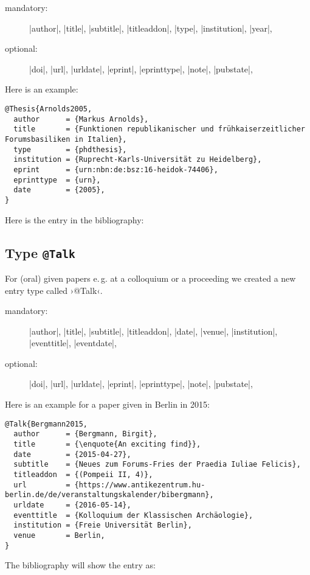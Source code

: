 \documentclass[a4paper,
10pt,
greek,
french,
spanish,
italian,
ngerman,
english
]{ltxdoc}
\begin{document}
\begin{description}
\item[mandatory:] 
|author|,
|title|, |subtitle|, |titleaddon|,
|type|, |institution|,
|year|,
\item[optional:]
|doi|, |url|, |urldate|, |eprint|, |eprinttype|, |note|, |pubstate|, 
 \end{description}
 

Here is an example:
\begin{lstlisting}[style=bibentry,label=Arnolds2005,caption={{@}Thesis\{Arnolds2005,…\} }]
@Thesis{Arnolds2005,
  author      = {Markus Arnolds},
  title       = {Funktionen republikanischer und frühkaiserzeitlicher Forumsbasiliken in Italien},
  type        = {phdthesis},
  institution = {Ruprecht-Karls-Universität zu Heidelberg},
  eprint      = {urn:nbn:de:bsz:16-heidok-74406},
  eprinttype  = {urn},
  date        = {2005},
}
\end{lstlisting}

Here is the entry in the bibliography:


 

 \subsection{Type \texttt{@Talk}}\label{talk}
For (oral) given papers e.\,g. at a colloquium or a proceeding we created a new entry type called ›@Talk‹.

\begin{description}
\item[mandatory:] 
|author|,
|title|, |subtitle|, |titleaddon|,
|date|,
|venue|,
|institution|,
|eventtitle|,
|eventdate|,
\item[optional:]
|doi|, |url|, |urldate|, |eprint|, |eprinttype|, |note|, |pubstate|, 
 \end{description}
 
Here is an example for a  paper  given in Berlin in 2015:
\begin{lstlisting}[style=bibentry,label=Bergmann2015,caption={{@}Talk\{Bergmann2015,…\} }]
@Talk{Bergmann2015,
  author      = {Bergmann, Birgit},
  title       = {\enquote{An exciting find}},
  date        = {2015-04-27},
  subtitle    = {Neues zum Forums-Fries der Praedia Iuliae Felicis},
  titleaddon  = {(Pompeii II, 4)},
  url         = {https://www.antikezentrum.hu-berlin.de/de/veranstaltungskalender/bibergmann},
  urldate     = {2016-05-14},
  eventtitle  = {Kolloquium der Klassischen Archäologie},
  institution = {Freie Universität Berlin},
  venue       = Berlin,
}
\end{lstlisting}
The bibliography will show the entry as:
\end{document}
